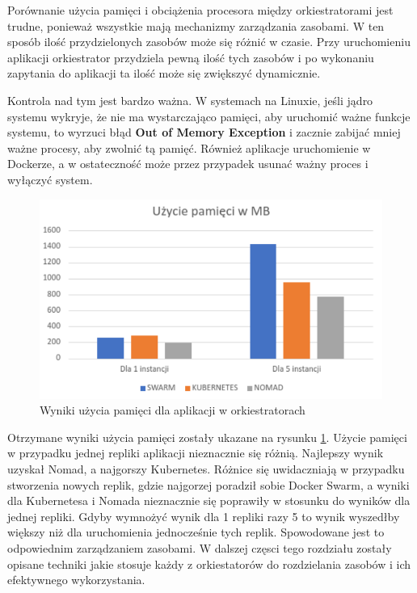 \documentclass{iiuwb}
\begin{document}
Porównanie użycia pamięci i obciążenia procesora między orkiestratorami
jest trudne, ponieważ wszystkie mają mechanizmy zarządzania zasobami. W ten
sposób ilość przydzielonych zasobów może się różnić w czasie. Przy uruchomieniu 
aplikacji orkiestrator przydziela pewną ilość tych zasobów i po wykonaniu 
zapytania do aplikacji ta ilość może się zwiększyć dynamicznie.

Kontrola nad tym jest bardzo ważna. W systemach na Linuxie, jeśli jądro systemu
wykryje, że nie ma wystarczająco pamięci, aby uruchomić ważne funkcje systemu, to
wyrzuci błąd \textbf{Out of Memory Exception} i zacznie zabijać mniej ważne procesy, 
aby zwolnić tą pamięć. Również aplikacje uruchomienie w Dockerze, a w ostateczność
może przez przypadek usunać ważny proces i wyłączyć system.

\begin{figure}[!h]
  \centering
  \includegraphics[width=12cm]{wynikiUzyciePamieci.pdf}
  \caption{Wyniki użycia pamięci dla aplikacji w orkiestratorach}
  \label{fig: Uzycie pamieci}
\end{figure}

Otrzymane wyniki użycia pamięci zostały ukazane na rysunku 
\ref{fig: Uzycie pamieci}. Użycie pamięci w przypadku jednej 
repliki aplikacji nieznacznie się różnią. Najlepszy wynik uzyskał 
Nomad, a najgorszy Kubernetes. Różnice się uwidaczniają 
w przypadku stworzenia nowych replik, gdzie najgorzej poradził 
sobie Docker Swarm, a wyniki dla Kubernetesa i Nomada nieznacznie 
się poprawiły w stosunku do wyników dla jednej repliki. Gdyby wymnożyć 
wynik dla 1 repliki razy 5 to wynik wyszedłby większy niż dla 
uruchomienia jednocześnie tych replik. Spowodowane jest to 
odpowiednim zarządzaniem zasobami. W dalszej częsci tego rozdziału 
zostały opisane techniki jakie stosuje każdy z orkiestatorów 
do rozdzielania zasobów i ich efektywnego wykorzystania.
\newline
\end{document}
